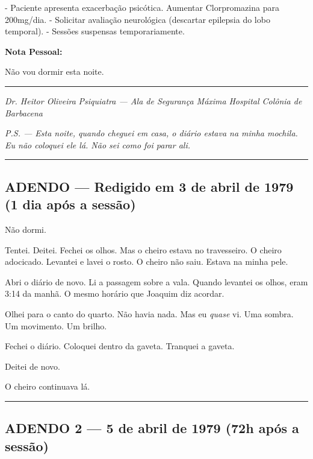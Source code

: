 \noindent - Paciente apresenta exacerbação psicótica. Aumentar Clorpromazina para 200mg/dia.
- Solicitar avaliação neurológica (descartar epilepsia do lobo temporal).
- Sessões suspensas temporariamente.

\noindent \textbf{Nota Pessoal:}

\noindent Não vou dormir esta noite.

\vspace{0.5em}\noindent\rule{\textwidth}{0.5pt}\vspace{0.5em}

\noindent \textit{Dr. Heitor Oliveira}
\textit{Psiquiatra --- Ala de Segurança Máxima}
\textit{Hospital Colônia de Barbacena}

\noindent \textit{P.S. --- Esta noite, quando cheguei em casa, o diário estava na minha mochila. Eu não coloquei ele lá. Não sei como foi parar ali.}

\vspace{0.5em}\noindent\rule{\textwidth}{0.5pt}\vspace{0.5em}

\subsection*{ADENDO --- Redigido em 3 de abril de 1979 (1 dia após a sessão)}

\noindent Não dormi.

\noindent Tentei. Deitei. Fechei os olhos. Mas o cheiro estava no travesseiro. O cheiro adocicado. Levantei e lavei o rosto. O cheiro não saiu. Estava na minha pele.

\noindent Abri o diário de novo. Li a passagem sobre a vala. Quando levantei os olhos, eram 3:14 da manhã. O mesmo horário que Joaquim diz acordar.

\noindent Olhei para o canto do quarto. Não havia nada. Mas eu \textit{quase} vi. Uma sombra. Um movimento. Um brilho.

\noindent Fechei o diário. Coloquei dentro da gaveta. Tranquei a gaveta.

\noindent Deitei de novo.

\noindent O cheiro continuava lá.

\vspace{0.5em}\noindent\rule{\textwidth}{0.5pt}\vspace{0.5em}

\subsection*{ADENDO 2 --- 5 de abril de 1979 (72h após a sessão)}

